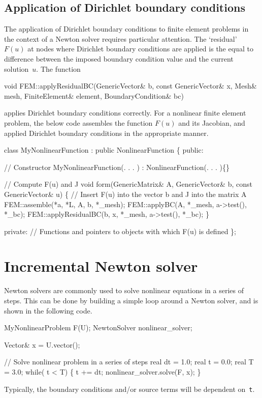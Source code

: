 \subsection{Application of Dirichlet boundary conditions}
%
The application of Dirichlet boundary conditions to finite element
problems in the context of a Newton solver requires particular 
attention. The `residual' $F(u)$ at nodes where Dirichlet boundary
conditions are applied is the equal to difference between the 
imposed boundary condition value and the current solution~$u$.
The function 
\begin{code}
void FEM::applyResidualBC(GenericVector& b, 
           const GenericVector& x, Mesh& mesh,
           FiniteElement& element, BoundaryCondition& bc)
\end{code}
applies Dirichlet boundary conditions correctly. For a nonlinear
finite element problem, the below code assembles the function $F(u)$
and its Jacobian, and applied Dirichlet boundary conditions in the
appropriate manner.
%
\begin{code}
class MyNonlinearFunction : public NonlinearFunction
\{
  public: 
  
    // Constructor 
    MyNonlinearFunction(. . . ) : NonlinearFunction(. . . )\{\}
  
    // Compute F(u) and J 
    void form(GenericMatrix& A, GenericVector& b, 
              const GenericVector& u)
    \{
      // Insert F(u) into the vector b and J into the matrix A 
      FEM::assemble(*a, *L, A, b, *_mesh);
      FEM::applyBC(A, *_mesh, a->test(), *_bc);
      FEM::applyResidualBC(b, x, *_mesh, a->test(), *_bc);
    \}

  private:
    // Functions and pointers to objects with which F(u) is defined
\};
\end{code}


\section{Incremental Newton solver}
%
Newton solvers are commonly used to solve nonlinear equations in a series 
of steps. This can be done by building a simple loop around a Newton solver,
and is shown in the following code.
%
\begin{code}
MyNonlinearProblem F(U);
NewtonSolver nonlinear_solver;

Vector& x = U.vector();

// Solve nonlinear problem in a series of steps
real dt = 1.0; real t  = 0.0; real T  = 3.0;
while( t < T)
\{
  t += dt;
  nonlinear_solver.solve(F, x);
\}
\end{code}
%
Typically, the boundary conditions and/or source terms will be dependent 
on~\texttt{t}.
 



